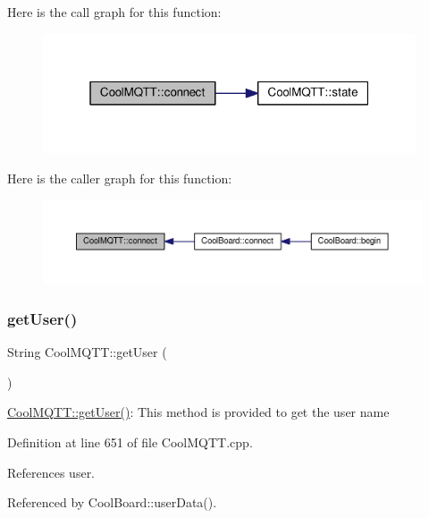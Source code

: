 Here is the call graph for this function\+:\nopagebreak
\begin{figure}[H]
\begin{center}
\leavevmode
\includegraphics[width=313pt]{classCoolMQTT_a58b0b1f64b269c2681685208262fba1d_cgraph}
\end{center}
\end{figure}
Here is the caller graph for this function\+:
\nopagebreak
\begin{figure}[H]
\begin{center}
\leavevmode
\includegraphics[width=350pt]{classCoolMQTT_a58b0b1f64b269c2681685208262fba1d_icgraph}
\end{center}
\end{figure}
\mbox{\label{classCoolMQTT_a373cc92fca7760d886f02d8a6e5b3f63}} 
\subsubsection{\texorpdfstring{get\+User()}{getUser()}}
{\footnotesize\ttfamily String Cool\+M\+Q\+T\+T\+::get\+User (\begin{DoxyParamCaption}{ }\end{DoxyParamCaption})}

\hyperlink{classCoolMQTT_a373cc92fca7760d886f02d8a6e5b3f63}{Cool\+M\+Q\+T\+T\+::get\+User()}\+: This method is provided to get the user name 

Definition at line 651 of file Cool\+M\+Q\+T\+T.\+cpp.



References user.



Referenced by Cool\+Board\+::user\+Data().


